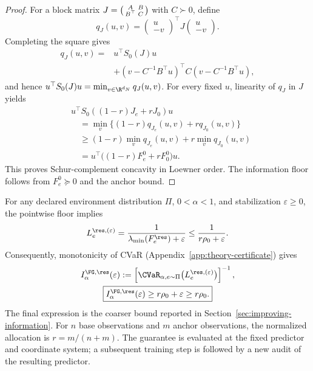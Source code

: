 \begin{proof}
For a block matrix $J=\begin{psmallmatrix}A&B\\B^\top&C\end{psmallmatrix}$ with $C\succ0$, define
\begin{equation}
q_J(u,v)=
\begin{pmatrix}u\\-v\end{pmatrix}^{\!\top}
J\begin{pmatrix}u\\-v\end{pmatrix}.
\label{eq:reserve-quadratic-form}
\end{equation}
Completing the square gives
\begin{equation}
\begin{aligned}
q_J(u,v)
={}&u^\top S_0(J)u\\
&+(v-C^{-1}B^\top u)^\top
C(v-C^{-1}B^\top u),
\end{aligned}
\label{eq:reserve-schur-variational}
\end{equation}
and hence $u^\top S_0(J)u=\min_{v\in\R^{d_N}}q_J(u,v)$. For every fixed $u$, linearity of $q_J$ in $J$ yields
\begin{equation}
\begin{aligned}
&u^\top S_0((1-r)J_e+rJ_0)u\\
&\quad=\min_v\{(1-r)q_{J_e}(u,v)+rq_{J_0}(u,v)\}\\
&\quad\ge(1-r)\min_vq_{J_e}(u,v)+r\min_vq_{J_0}(u,v)\\
&\quad=u^\top\bigl((1-r)F_e^0+rF_0^0\bigr)u.
\end{aligned}
\label{eq:reserve-schur-concavity}
\end{equation}
This proves Schur-complement concavity in Loewner order. The information floor follows from $F_e^0\succeq0$ and the anchor bound.
\end{proof}

For any declared environment distribution $\Pi$, $0<\alpha<1$, and stabilization $\varepsilon\ge0$, the pointwise floor implies
\begin{equation}
L_e^{\res,(\varepsilon)}
=\frac{1}{\lambda_{\min}(F_e^{\res})+\varepsilon}
\le\frac{1}{r\rho_0+\varepsilon}.
\label{eq:reserve-inverse-information-bound}
\end{equation}
Consequently, monotonicity of CVaR (Appendix~\ref{app:theory-certificate}) gives
\begin{equation}
\begin{gathered}
I_\alpha^{\FG,\res}(\varepsilon)
:=\left[\CVaR_{\alpha,e\sim\Pi}
\bigl(L_e^{\res,(\varepsilon)}\bigr)\right]^{-1},\\
\boxed{I_\alpha^{\FG,\res}(\varepsilon)
\ge r\rho_0+\varepsilon\ge r\rho_0.}
\end{gathered}
\label{eq:reserve-certificate-bound}
\end{equation}
The final expression is the coarser bound reported in Section~\ref{sec:improving-information}. For $n$ base observations and $m$ anchor observations, the normalized allocation is $r=m/(n+m)$. The guarantee is evaluated at the fixed predictor and coordinate system; a subsequent training step is followed by a new audit of the resulting predictor.

